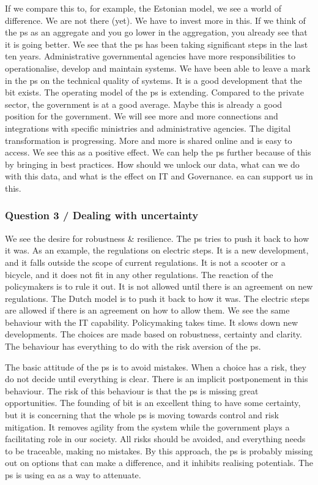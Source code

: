 If we compare this to, for example, the Estonian model, we see a world of difference. We are not there (yet). We have to invest more in this. If we think of the \gls{ps} as an aggregate and you go lower in the aggregation, you already see that it is going better. We see that the \gls{ps} has been taking significant steps in the last ten years. Administrative governmental agencies have more responsibilities to operationalise, develop and maintain systems. We have been able to leave a mark in the \acrshort{ps} on the technical quality of systems. It is a good development that the \acrshort{bit} exists. The operating model of the \gls{ps} is extending. Compared to the private sector, the government is at a good average. Maybe this is already a good position for the government. We will see more and more connections and integrations with specific ministries and administrative agencies. The digital transformation is progressing. More and more is shared online and is easy to access. We see this as a positive effect. We can help the \gls{ps} further because of this by bringing in best practices. How should we unlock our data, what can we do with this data, and what is the effect on IT and Governance. \acrshort{ea} can support us in this.
\subsubsection{Question 3 / Dealing with uncertainty}
We see the desire for robustness \& resilience. The \gls{ps} tries to push it back to how it was. As an example, the regulations on electric steps. It is a new development, and it falls outside the scope of current regulations. It is not a scooter or a bicycle, and it does not fit in any other regulations. The reaction of the policymakers is to rule it out. It is not allowed until there is an agreement on new regulations. The Dutch model is to push it back to how it was. The electric steps are allowed if there is an agreement on how to allow them. We see the same behaviour with the  IT capability. Policymaking takes time. It slows down new developments. The choices are made based on robustness, certainty and clarity. The behaviour has everything to do with the risk aversion of the \gls{ps}.

The basic attitude of the \gls{ps} is to avoid mistakes. When a choice has a risk, they do not decide until everything is clear. There is an implicit postponement in this behaviour. The risk of this behaviour is that the \gls{ps} is missing great opportunities. The founding of \acrshort{bit} is an excellent thing to have some certainty, but it is concerning that the whole \gls{ps} is moving towards control and risk mitigation. It removes agility from the system while the government plays a facilitating role in our society. All risks should be avoided, and everything needs to be traceable, making no mistakes. By this approach, the \gls{ps} is probably missing out on options that can make a difference, and it inhibits realising potentials. The \gls{ps} is using \acrshort{ea} as a way to attenuate. 
